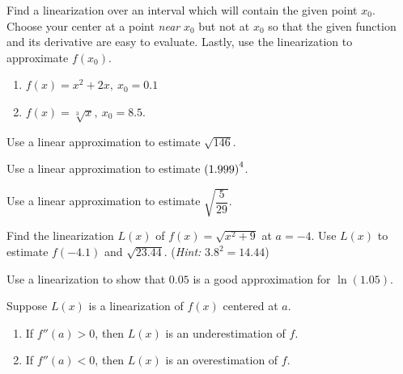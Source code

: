 \documentclass[../mathNotesPreamble]{subfiles}
\begin{document}
\pagebreak
\begin{ex*}
  Find a linearization over an interval which will contain the given point $x_0$. Choose your center at a point \textit{near} $x_0$ but not at $x_0$ so that the given function and its derivative are easy to evaluate. Lastly, use the linearization to approximate $f(x_0)$.
\end{ex*}
\begin{enumerate}[label=\alph*), itemsep=\stretch{1}]
  \item $f(x)=x^2+2x,\ x_0=0.1$
  \item $f(x)=\sqrt[3]{x},\ x_0=8.5$.
\end{enumerate}
\pagebreak

\begin{ex*}
  Use a linear approximation to estimate $\sqrt{146}$.
\end{ex*}

\begin{ex*}
  Use a linear approximation to estimate ${\left(1.999\right)}^4$.
\end{ex*}

\begin{ex*}
  Use a linear approximation to estimate $\sqrt{\dfrac{5}{29}}$.
\end{ex*}
\pagebreak

\begin{ex*}
  Find the linearization $L(x)$ of $f(x)=\sqrt{x^2+9}$ at $a=-4$. Use $L(x)$ to estimate $f(-4.1)$ and $\sqrt{23.44}$. (\textit{Hint:} $3.8^2=14.44$)
\end{ex*}
  
\begin{ex*}
  Use a linearization to show that $0.05$ is a good approximation for $\ln(1.05)$.
\end{ex*}
\pagebreak

\begin{thmBox*}
  Suppose $L(x)$ is a linearization of $f(x)$ centered at $a$.
  \begin{enumerate}
    \item
        If $f''(a)>0$, then $L(x)$ is an underestimation of $f$.
    \item 
        If $f''(a)<0$, then $L(x)$ is an overestimation of $f$.
  \end{enumerate}
\end{thmBox*}
\end{document}
